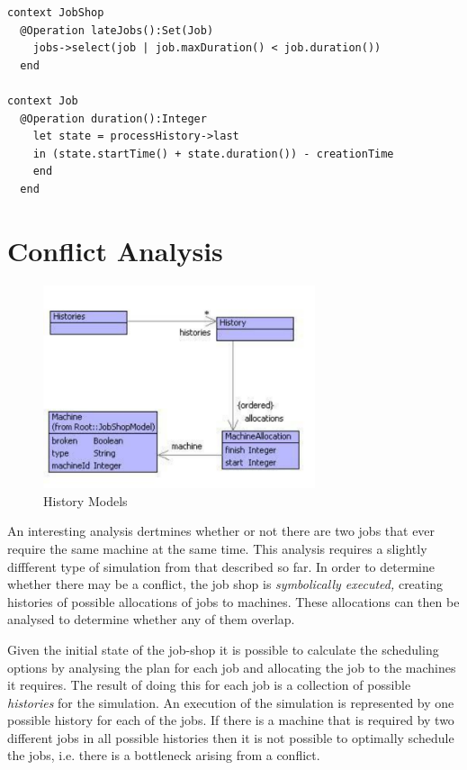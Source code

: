 \begin{lstlisting}
context JobShop
  @Operation lateJobs():Set(Job)
    jobs->select(job | job.maxDuration() < job.duration())
  end

context Job
  @Operation duration():Integer
    let state = processHistory->last
    in (state.startTime() + state.duration()) - creationTime
    end
  end
\end{lstlisting}
\section{Conflict Analysis}

\label{sec:Conflict-Analysis}

%
\begin{figure}
\begin{center}
\includegraphics[width=8cm]{Programming/Simulation/Images/HistoryModels.pdf}

\caption{History Models\label{fig:History-Models}}

\end{center}
\end{figure}


An interesting analysis dertmines whether or not there are two jobs
that ever require the same machine at the same time. This analysis
requires a slightly diffferent type of simulation from that described
so far. In order to determine whether there may be a conflict, the
job shop is \emph{symbolically executed,} creating histories of possible
allocations of jobs to machines. These allocations can then be analysed
to determine whether any of them overlap.

Given the initial state of the job-shop it is possible to calculate
the scheduling options by analysing the plan for each job and allocating
the job to the machines it requires. The result of doing this for
each job is a collection of possible \emph{histories} for the simulation.
An execution of the simulation is represented by one possible history
for each of the jobs. If there is a machine that is required by two
different jobs in all possible histories then it is not possible to
optimally schedule the jobs, i.e. there is a bottleneck arising from
a conflict.

